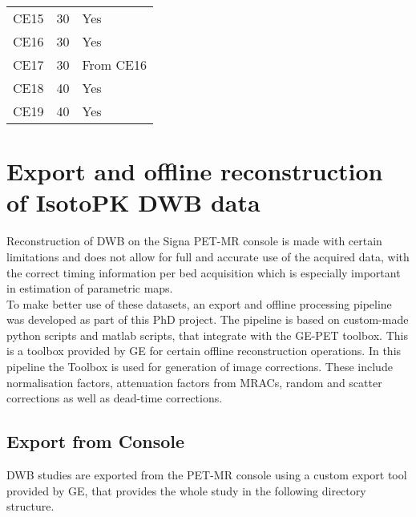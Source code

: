 \begin{table}[]
\begin{tabular}{|l|l|l|}
CE15                & 30                                             & Yes  \\
CE16                & 30                                             & Yes  \\
CE17                & 30                                             & From CE16     \\
CE18                & 40                                             & Yes  \\
CE19                & 40                                             & Yes  \\
\bottomrule
\end{tabular}
\end{table}


\section{Export and offline reconstruction of IsotoPK DWB data}
Reconstruction of DWB on the Signa PET-MR console is made with certain limitations and does not allow for full and accurate use of the acquired data, with the correct timing information per bed acquisition which is especially important in estimation of parametric maps. \\
To make better use of these datasets, an export and offline processing pipeline was developed as part of this PhD project. The pipeline is based on custom-made python scripts and matlab scripts, that integrate with the GE-PET toolbox. This is a toolbox provided by GE for certain offline reconstruction operations. In this pipeline the Toolbox is used for generation of image corrections. These include normalisation factors, attenuation factors from MRACs, random and scatter corrections as well as dead-time corrections. 

\subsection{Export from Console}
DWB studies are exported from the PET-MR console using a custom export tool provided by GE, that provides the whole study in the following directory structure.  \\

